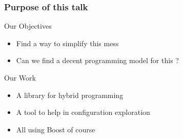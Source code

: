 \frame
{
  \frametitle{Purpose of this talk}
  \begin{block}{Our Objectives}
  \begin{itemize}
  \footnotesize
  \item Find a way to simplify this mess
  \item Can we find a decent programming model for this ?
  \end{itemize}
  \end{block}{}

  \begin{block}{Our Work}
  \begin{itemize}
  \footnotesize
  \item A library for hybrid programming
  \item A tool to help in configuration exploration
  \item All using Boost of course
  \end{itemize}
  \end{block}{}
}
